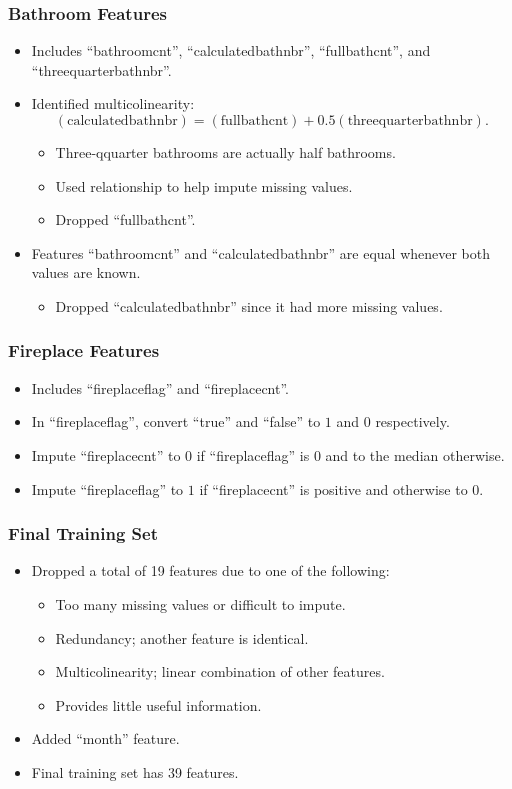 \documentclass{beamer}
\begin{document}
\begin{frame}
\frametitle{Bathroom Features}
\begin{itemize}
\item Includes ``bathroomcnt'', ``calculatedbathnbr'', ``fullbathcnt'', and ``threequarterbathnbr''.
\item Identified multicolinearity:
\[ (\mbox{calculatedbathnbr}) = (\mbox{fullbathcnt}) + 0.5(\mbox{threequarterbathnbr}). \]
\begin{itemize}
\item Three-qquarter bathrooms are actually half bathrooms.
\item Used relationship to help impute missing values.
\item Dropped ``fullbathcnt''.
\end{itemize}
\item Features ``bathroomcnt'' and ``calculatedbathnbr'' are equal whenever both values are known.
\begin{itemize}
\item Dropped ``calculatedbathnbr'' since  it had more missing values.
\end{itemize}
\end{itemize}
\end{frame}


\begin{frame}
\frametitle{Fireplace Features}
\begin{itemize}
\item Includes ``fireplaceflag'' and ``fireplacecnt''.
\item In ``fireplaceflag'', convert ``true'' and ``false'' to $1$ and $0$ respectively.
\item Impute ``fireplacecnt'' to $0$ if ``fireplaceflag'' is $0$ and to the median otherwise.
\item Impute ``fireplaceflag'' to $1$ if ``fireplacecnt'' is positive and otherwise to $0$.
\end{itemize}
\end{frame}

\begin{frame}
\frametitle{Final Training Set}
\begin{itemize}
\item Dropped a total of 19 features due to one of the following:
\begin{itemize}
\item Too many missing values or difficult to impute.
\item Redundancy; another feature is identical.
\item Multicolinearity; linear combination of other features.
\item Provides little useful information.
\end{itemize}
\item Added ``month'' feature.
\item Final training set has 39 features.
\end{itemize}
\end{frame}
\end{document}
